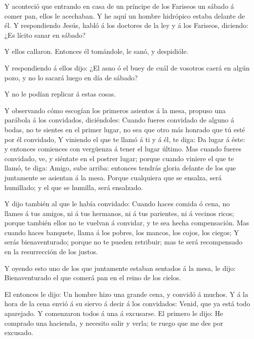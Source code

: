  Y aconteció que entrando en casa de un príncipe de los
Fariseos un sábado á comer pan, ellos le acechaban.  Y he
aquí un hombre hidrópico estaba delante de él.  Y
respondiendo Jesús, habló á los doctores de la ley y á los Fariseos,
diciendo: ¿Es lícito sanar en sábado?

 Y ellos callaron. Entonces él tomándole, le sanó, y
despidióle.

 Y respondiendo á ellos dijo: ¿El asno ó el buey de cuál de
vosotros caerá en algún pozo, y no lo sacará luego en día de sábado?

 Y no le podían replicar á estas cosas.

 Y observando cómo escogían los primeros asientos á la mesa,
propuso una parábola á los convidados, diciéndoles:  Cuando
fueres convidado de alguno á bodas, no te sientes en el primer lugar, no
sea que otro más honrado que tú esté por él convidado,  Y
viniendo el que te llamó á ti y á él, te diga: Da lugar á éste: y
entonces comiences con vergüenza á tener el lugar último. 
Mas cuando fueres convidado, ve, y siéntate en el postrer lugar; porque
cuando viniere el que te llamó, te diga: Amigo, sube arriba: entonces
tendrás gloria delante de los que juntamente se asientan á la mesa.
 Porque cualquiera que se ensalza, será humillado; y el que
se humilla, será ensalzado.

 Y dijo también al que le había convidado: Cuando haces
comida ó cena, no llames á tus amigos, ni á tus hermanos, ni á tus
parientes, ni á vecinos ricos; porque también ellos no te vuelvan á
convidar, y te sea hecha compensación.  Mas cuando haces
banquete, llama á los pobres, los mancos, los cojos, los ciegos;
 Y serás bienaventurado; porque no te pueden retribuir; mas
te será recompensado en la resurrección de los justos.

 Y oyendo esto uno de los que juntamente estaban sentados á
la mesa, le dijo: Bienaventurado el que comerá pan en el reino de los
cielos.

 El entonces le dijo: Un hombre hizo una grande cena, y
convidó á muchos.  Y á la hora de la cena envió á su siervo
á decir á los convidados: Venid, que ya está todo aparejado.
 Y comenzaron todos á una á excusarse. El primero le dijo:
He comprado una hacienda, y necesito salir y verla; te ruego que me des
por excusado.

